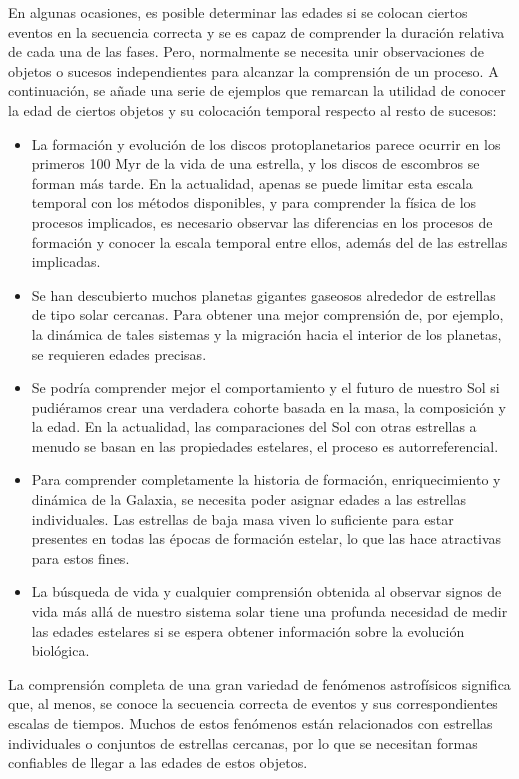En algunas ocasiones, es posible determinar las edades si se colocan ciertos eventos en la secuencia correcta y se es capaz de comprender la duración relativa de cada una de las fases. Pero, normalmente se necesita unir observaciones de objetos o sucesos independientes para alcanzar la comprensión de un proceso. A continuación, se añade una serie de ejemplos que remarcan la utilidad de conocer la edad de ciertos objetos y su colocación temporal respecto al resto de sucesos:
\begin{itemize}
\item La formación y evolución de los discos protoplanetarios parece ocurrir en los primeros 100 Myr de la vida de una estrella, y los discos de escombros se forman más tarde. En la actualidad, apenas se puede limitar esta escala temporal con los métodos disponibles, y para comprender la física de los procesos implicados, es necesario observar las diferencias en los procesos de formación y conocer la escala temporal entre ellos, además del de las estrellas implicadas.
\item Se han descubierto muchos planetas gigantes gaseosos alrededor de estrellas de tipo solar cercanas. Para obtener una mejor comprensión de, por ejemplo, la dinámica de tales sistemas y la migración hacia el interior de los planetas, se requieren edades precisas.
\item Se podría comprender mejor el comportamiento y el futuro de nuestro Sol si pudiéramos crear una verdadera cohorte basada en la masa, la composición y la edad. En la actualidad, las comparaciones del Sol con otras estrellas a menudo se basan en las propiedades estelares, el proceso es autorreferencial.
\item Para comprender completamente la historia de formación, enriquecimiento y dinámica de la Galaxia, se necesita poder asignar edades a las estrellas individuales. Las estrellas de baja masa viven lo suficiente para estar presentes en todas las épocas de formación estelar, lo que las hace atractivas para estos fines.
\item La búsqueda de vida y cualquier comprensión obtenida al observar signos de vida más allá de nuestro sistema solar tiene una profunda necesidad de medir las edades estelares si se espera obtener información sobre la evolución biológica.
\end{itemize}

La comprensión completa de una gran variedad de fenómenos astrofísicos significa que, al menos, se conoce la secuencia correcta de eventos y sus correspondientes escalas de tiempos. Muchos de estos fenómenos están relacionados con estrellas individuales o conjuntos de estrellas cercanas, por lo que se necesitan formas confiables de llegar a las edades de estos objetos.

